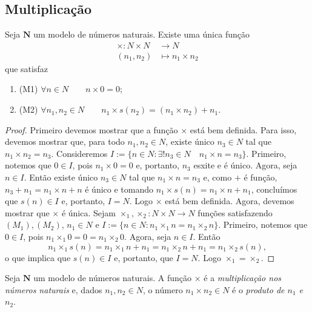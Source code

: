 \subsection{Multiplicação}

\begin{teo}
	Seja $\bm N$ um modelo de números naturais. Existe uma única função
	\begin{align*}
	\times: N \times N &\to N \\
			(n_1,n_2) &\mapsto n_1 \times n_2
	\end{align*}
que satisfaz
	\begin{enumerate}
	\item (M1) $\forall n \in N \qquad n \times 0 = 0$;
	\item (M2) $\forall n_1,n_2 \in N \qquad n_1 \times s(n_2) = (n_1 \times n_2) + n_1$.
	\end{enumerate}
\end{teo}
\begin{proof}
	Primeiro devemos mostrar que a função $\times$ está bem definida. Para isso, devemos mostrar que, para todo $n_1,n_2 \in N$, existe único $n_3 \in N$ tal que $n_1 \times n_2=n_3$. Consideremos $I := \{n \in N : \exists! n_3 \in N \quad n_1 \times n = n_3\}$. Primeiro, notemos que $0 \in I$, pois $n_1 \times 0 = 0$ e, portanto, $n_3$ esxite e é único. Agora, seja $n \in I$. Então existe único $n_3 \in N$ tal que $n_1 \times n = n_3$ e, como $+$ é função, $n_3 + n_1=n_1 \times n + n$ é único e tomando $n_1 \times s(n)=n_1 \times n + n_1$, concluímos que $s(n) \in I$ e, portanto, $I=N$. Logo $\times$ está bem definida. Agora, devemos mostrar que $\times$ é única. Sejam $\times_1,\times_2: N \times N \to N$ funções satisfazendo $(M_1),(M_2)$, $n_1 \in N$ e $I := \{n \in N : n_1 \times_1 n = n_1 \times_2 n\}$. Primeiro, notemos que $0 \in I$, pois $n_1 \times_1 0 = 0 = n_1 \times_2 0$. Agora, seja $n \in I$. Então
	\begin{equation*}
	n_1 \times_1 s(n) = n_1 \times_1 n + n_1 = n_1 \times_2 n + n_1 = n_1 \times_2 s(n),
	\end{equation*}
o que implica que $s(n) \in I$ e, portanto, que $I=N$. Logo $\times_1=\times_2$.
\end{proof}

\begin{defi}
	Seja $\bm N$ um modelo de números naturais. A função $\times$ é a \emph{multiplicação nos números naturais} e, dados $n_1,n_2 \in N$, o número $n_1 \times n_2 \in N$ é o \emph{produto de $n_1$ e $n_2$}.
\end{defi}

